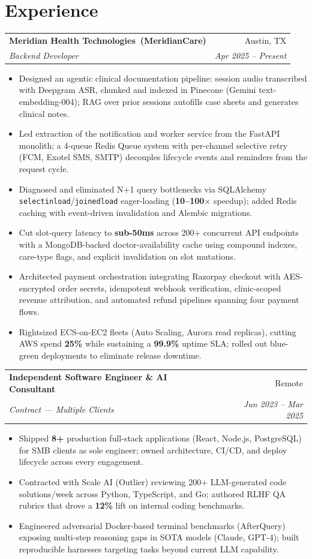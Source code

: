 \documentclass[11pt]{article}
\makeatletter
\newcommand{\resumeentry}[4]{%
  \begin{tabular*}{\textwidth}{@{}l@{\extracolsep{\fill}}r@{}}
    \textbf{#1} & #2 \\
    \textit{#3} & \textit{#4} \\
  \end{tabular*}\vspace{1pt}%
}
\makeatother
\begin{document}
\section{Experience}
\resumeentry{Meridian Health Technologies\ (MeridianCare)}{Austin, TX}{Backend Developer}{Apr 2025 -- Present}
\begin{itemize}
  \item Designed an agentic clinical documentation pipeline: session audio transcribed with Deepgram ASR, chunked and indexed in Pinecone (Gemini text-embedding-004); RAG over prior sessions autofills case sheets and generates clinical notes.
  \item Led extraction of the notification and worker service from the FastAPI monolith; a 4-queue Redis Queue system with per-channel selective retry (FCM, Exotel SMS, SMTP) decouples lifecycle events and reminders from the request cycle.
  \item Diagnosed and eliminated N+1 query bottlenecks via SQLAlchemy \texttt{selectinload}/\texttt{joinedload} eager-loading (\textbf{10--100$\times$} speedup); added Redis caching with event-driven invalidation and Alembic migrations.
  \item Cut slot-query latency to \textbf{sub-50ms} across 200+ concurrent API endpoints with a MongoDB-backed doctor-availability cache using compound indexes, care-type flags, and explicit invalidation on slot mutations.
  \item Architected payment orchestration integrating Razorpay checkout with AES-encrypted order secrets, idempotent webhook verification, clinic-scoped revenue attribution, and automated refund pipelines spanning four payment flows.
  \item Rightsized ECS-on-EC2 fleets (Auto Scaling, Aurora read replicas), cutting AWS spend \textbf{25\%} while sustaining a \textbf{99.9\%} uptime SLA; rolled out blue-green deployments to eliminate release downtime.
\end{itemize}

\resumeentry{Independent Software Engineer \& AI Consultant}{Remote}{Contract --- Multiple Clients}{Jun 2023 -- Mar 2025}
\begin{itemize}
  \item Shipped \textbf{8+} production full-stack applications (React, Node.js, PostgreSQL) for SMB clients as sole engineer; owned architecture, CI/CD, and deploy lifecycle across every engagement.
  \item Contracted with Scale AI (Outlier) reviewing 200+ LLM-generated code solutions/week across Python, TypeScript, and Go; authored RLHF QA rubrics that drove a \textbf{12\%} lift on internal coding benchmarks.
  \item Engineered adversarial Docker-based terminal benchmarks (AfterQuery) exposing multi-step reasoning gaps in SOTA models (Claude, GPT-4); built reproducible harnesses targeting tasks beyond current LLM capability.
\end{itemize}
\end{document}
